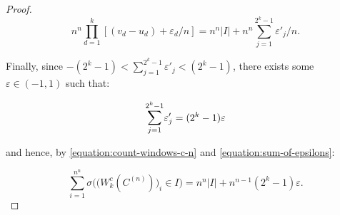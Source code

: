 \documentclass[11pt,a4paper]{tesis}
\theoremstyle{plain}
\theoremstyle{definition}
\begin{document}
\begin{proof}
  \begin{equation}\label{equation:sum-of-epsilons}
    n^n \prod_{d = 1}^{k} [(v_d - u_d) + \varepsilon_d / n] = n^n |I| + n^n \sum_{j = 1}^{2^k - 1} \varepsilon'_j / n \text{.}
  \end{equation}

  Finally, since $- (2^k - 1) < \sum_{j = 1}^{2^k - 1} \varepsilon'_j < (2^k - 1)$, there exists some $\varepsilon \in (-1, 1)$ such that:

  \begin{equation*}
    \mathlarger{\sum}_{j = 1}^{2^k - 1} \varepsilon'_j = (2^k - 1) \varepsilon
  \end{equation*}

  and hence, by \ref{equation:count-windows-c-n} and \ref{equation:sum-of-epsilons}:

  \begin{equation*}
    \sum_{i = 1}^{n^n} \sigma\Big( \big( W_k^{c}(C^{(n)}) \big)_i \in I \Big) = n^n |I| + n^{n - 1} (2^k - 1) \varepsilon \text{.}
  \end{equation*}
\end{proof}
\end{document}
